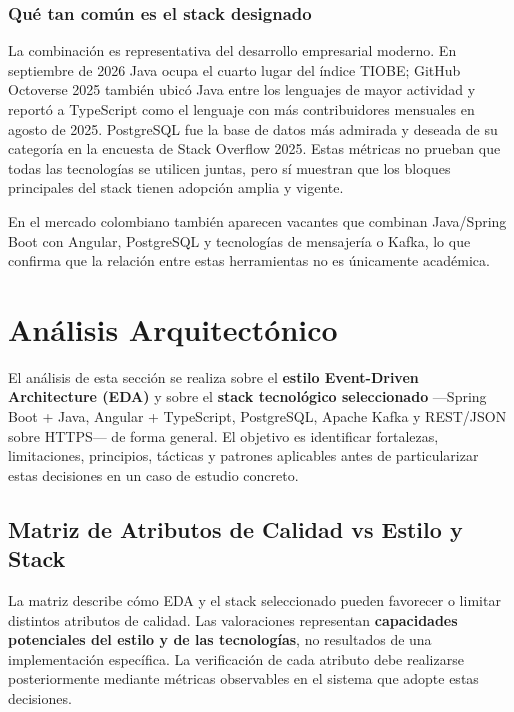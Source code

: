 \documentclass[12pt,a4paper]{article}
\begin{document}
\subsubsection{Qué tan común es el stack designado}

La combinación es representativa del desarrollo empresarial moderno. En septiembre de 2026 Java ocupa el cuarto lugar del índice TIOBE; GitHub Octoverse 2025 también ubicó Java entre los lenguajes de mayor actividad y reportó a TypeScript como el lenguaje con más contribuidores mensuales en agosto de 2025. PostgreSQL fue la base de datos más admirada y deseada de su categoría en la encuesta de Stack Overflow 2025. Estas métricas no prueban que todas las tecnologías se utilicen juntas, pero sí muestran que los bloques principales del stack tienen adopción amplia y vigente. \cite{tiobe-2026,github-octoverse,so-2025}

En el mercado colombiano también aparecen vacantes que combinan Java/Spring Boot con Angular, PostgreSQL y tecnologías de mensajería o Kafka, lo que confirma que la relación entre estas herramientas no es únicamente académica. \cite{job-java-angular,job-java-kafka}

\section{Análisis Arquitectónico}

El análisis de esta sección se realiza sobre el \textbf{estilo Event-Driven Architecture (EDA)} y sobre el \textbf{stack tecnológico seleccionado} ---Spring Boot + Java, Angular + TypeScript, PostgreSQL, Apache Kafka y REST/JSON sobre HTTPS--- de forma general. El objetivo es identificar fortalezas, limitaciones, principios, tácticas y patrones aplicables antes de particularizar estas decisiones en un caso de estudio concreto.

\subsection{Matriz de Atributos de Calidad vs Estilo y Stack}

La matriz describe cómo EDA y el stack seleccionado pueden favorecer o limitar distintos atributos de calidad. Las valoraciones representan \textbf{capacidades potenciales del estilo y de las tecnologías}, no resultados de una implementación específica. La verificación de cada atributo debe realizarse posteriormente mediante métricas observables en el sistema que adopte estas decisiones.
\end{document}
